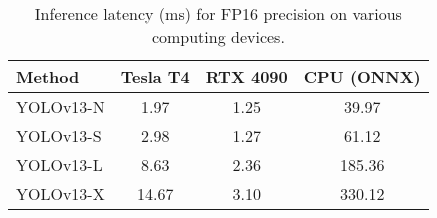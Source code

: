 \begin{table}[!tp]
\centering

\setlength{\tabcolsep}{3.8mm}
\caption{Inference latency (ms) for FP16 precision on various computing devices. }
\vspace{-0.2cm}
\label{tab:latency}
\renewcommand{\arraystretch}{1.0}
\begin{tabular}{lccc}
\toprule
\textbf{Method}           & \textbf{Tesla T4} & \textbf{RTX 4090} & \textbf{CPU (ONNX)}\\
\midrule
YOLOv13-N     & 1.97& 1.25& 39.97\\
YOLOv13-S    & 2.98& 1.27& 61.12\\
YOLOv13-L     & 8.63& 2.36& 185.36\\
YOLOv13-X    & 14.67& 3.10& 330.12\\
\bottomrule
\end{tabular}
\vspace{-0.3cm}
\end{table}

